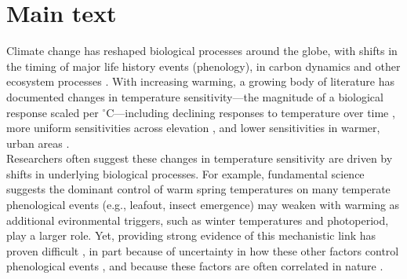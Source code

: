 \documentclass[11pt,letter]{article}
\begin{document}
\newpage
\section{Main text} %
Climate change has reshaped biological processes around the globe, with shifts in the timing of major life history events (phenology), in carbon dynamics and other ecosystem processes \citep{IPCC:2014sm}. With increasing warming,  a growing body of literature has documented changes in temperature sensitivity---the magnitude of a biological response scaled per $^{\circ}$C---including declining responses to temperature over time \citep{fu2015,gusewell2017,piao2017,dai2019ag}, more uniform sensitivities across elevation \citep{vitasse2018}, and lower sensitivities in warmer, urban areas \citep{meng2020}.\\

Researchers often suggest these changes in temperature sensitivity are driven by shifts in underlying biological processes. For example,  fundamental science suggests the dominant control of warm spring temperatures on many temperate phenological events (e.g., leafout, insect emergence) may weaken with warming as additional evironmental triggers, such as winter temperatures and photoperiod, play a larger role. Yet, providing strong evidence of this mechanistic link has proven difficult \citep[e.g.,][]{fu2015,gauzere2019}, in part because of uncertainty in how these other factors control phenological events \citep{chuine2016}, and because these factors are often correlated in nature \citep[e.g.,][]{fu2015}. \\
\end{document}
